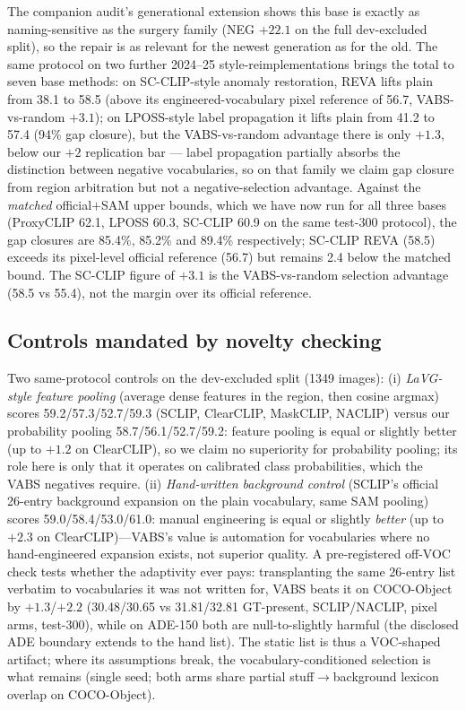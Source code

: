 \documentclass[11pt]{article}
\begin{document}
The companion audit's generational extension shows
this base is exactly as naming-sensitive as the surgery family (NEG $+22.1$ on
the full dev-excluded split), so
the repair is as relevant for the newest generation as for the old.
The same protocol on two further 2024--25 style-reimplementations brings the
total to seven base methods: on SC-CLIP-style anomaly restoration, REVA lifts
plain from 38.1 to 58.5 (above its engineered-vocabulary pixel reference of
56.7, VABS-vs-random $+3.1$); on LPOSS-style label propagation it lifts plain
from 41.2 to 57.4 (94\% gap closure), but the VABS-vs-random advantage there is
only $+1.3$, below our $+2$ replication bar --- label propagation partially
absorbs the distinction between negative vocabularies, so on that family we
claim gap closure from region arbitration but not a negative-selection
advantage. Against the \emph{matched} official$+$SAM upper bounds, which we
have now run for all three bases (ProxyCLIP 62.1, LPOSS 60.3, SC-CLIP 60.9 on
the same test-300 protocol), the gap closures are 85.4\%, 85.2\% and 89.4\%
respectively; SC-CLIP REVA (58.5) exceeds its pixel-level official reference
(56.7) but remains 2.4 below the matched bound. The SC-CLIP figure of $+3.1$
is the VABS-vs-random selection advantage (58.5 vs 55.4), not the margin over
its official reference.

\subsection{Controls mandated by novelty checking}
\label{sec:controls}
Two same-protocol controls on the dev-excluded split (1349 images): (i)
\emph{LaVG-style feature pooling} (average dense features in the region, then cosine
argmax) scores 59.2/57.3/52.7/59.3 (SCLIP, ClearCLIP, MaskCLIP, NACLIP) versus our
probability pooling 58.7/56.1/52.7/59.2: feature pooling is equal or slightly better
(up to $+1.2$ on ClearCLIP), so we claim no superiority for probability pooling; its
role here is only that it operates on calibrated class probabilities, which the VABS
negatives require. (ii) \emph{Hand-written background control} (SCLIP's official
26-entry background expansion on the plain vocabulary, same SAM pooling) scores
59.0/58.4/53.0/61.0: manual engineering is equal or slightly \emph{better} (up to
$+2.3$ on ClearCLIP)---VABS's value is automation for vocabularies where no
hand-engineered expansion exists, not superior quality. A pre-registered
off-VOC check tests whether the adaptivity ever pays: transplanting the same
26-entry list verbatim to vocabularies it was not written for, VABS beats it
on COCO-Object by $+1.3$/$+2.2$ (30.48/30.65 vs 31.81/32.81 GT-present,
SCLIP/NACLIP, pixel arms, test-300), while on ADE-150 both are null-to-slightly
harmful (the disclosed ADE boundary extends to the hand list). The static list
is thus a VOC-shaped artifact; where its assumptions break, the
vocabulary-conditioned selection is what remains (single seed; both arms share
partial stuff$\to$background lexicon overlap on COCO-Object).
\end{document}

